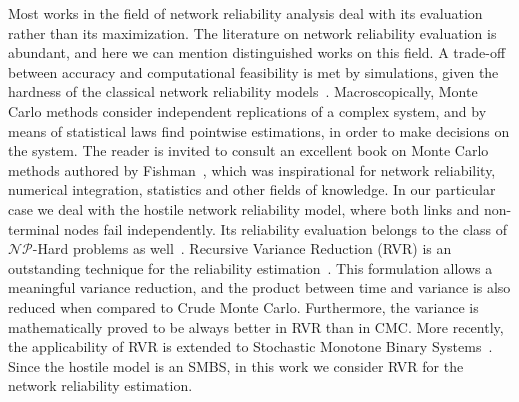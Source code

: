 \documentclass{llncs}
\begin{document}
Most works in the field of network reliability analysis deal with its evaluation rather than its maximization. The literature on network reliability evaluation is abundant, and here we can mention distinguished works on this field. A trade-off between accuracy and computational feasibility is met by simulations, 
given the hardness of the classical network reliability models~\cite{9}. Macroscopically, Monte Carlo methods 
consider independent replications of a complex system, and by means of statistical laws find pointwise 
estimations, in order to make decisions on the system. The reader is invited to consult an excellent book on 
Monte Carlo methods authored by Fishman~\cite{105}, which was inspirational for network reliability, numerical integration, statistics and other fields of knowledge. In our particular case we deal with the 
hostile network reliability model, where both links and non-terminal nodes fail independently. Its reliability evaluation belongs to the class of $\mathcal{NP}$-Hard problems as well~\cite{9}. Recursive Variance Reduction (RVR) is an outstanding technique for the reliability estimation~\cite{85}. This formulation allows a meaningful variance reduction, and the product between time and variance is also reduced when compared to Crude Monte Carlo. Furthermore, the variance is mathematically proved to be always better in RVR than in CMC. More recently, the applicability of RVR is extended to Stochastic Monotone Binary Systems~\cite{82}. Since the hostile model is an SMBS, in this work we consider RVR for the network reliability estimation.
  
\end{document}

